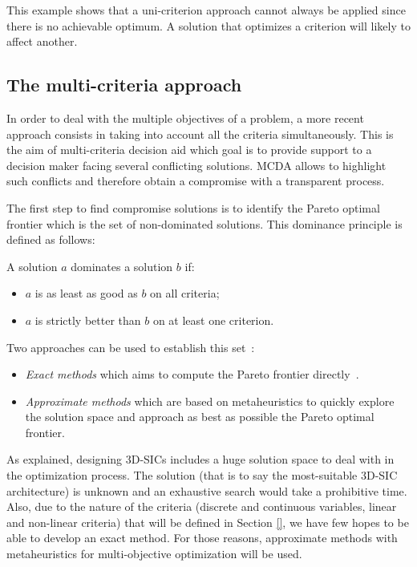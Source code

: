 This example shows that a uni-criterion approach cannot always be applied since there is no achievable optimum. A solution that optimizes a criterion will likely to affect another.

\subsection{The multi-criteria approach}
\label{subsex:rol.multicrit_approach}

In order to deal with the multiple objectives of a problem, a more recent approach consists in taking into account all the criteria simultaneously. This is the aim of multi-criteria decision aid which goal is to provide support to a decision maker facing several conflicting solutions. MCDA allows to highlight such conflicts and therefore obtain a compromise with a transparent process.

The first step to find compromise solutions is to identify the Pareto optimal frontier which is the set of non-dominated solutions. This dominance principle is defined as follows:

\begin{definition}[Dominance]
A solution $a$ dominates a solution $b$ if:
\begin{itemize}
\item $a$ is as least as good as $b$ on all criteria;
\item $a$ is strictly better than $b$ on at least one criterion.
\end{itemize}
\end{definition}

Two approaches can be used to establish this set~\cite{Vin92}:
\begin{itemize}
\item \textit{Exact methods} which aims to compute the Pareto frontier directly~\cite{EhrgottGandibleuxbook02,steuer86a}.
\item \textit{Approximate methods} which are based on metaheuristics to quickly explore the solution space and approach as best as possible the Pareto optimal frontier\cite{talbi09}.
\end{itemize}
As explained, designing 3D-SICs includes a huge solution space to deal with in the optimization process. The solution (that is to say the most-suitable 3D-SIC architecture) is unknown and an exhaustive search would take a prohibitive time. Also, due to the nature of the criteria (discrete and continuous variables, linear and non-linear criteria) that will be defined in Section \ref{}, we have few hopes to be able to develop an exact method. For those reasons, approximate methods with metaheuristics for multi-objective optimization will be used.

